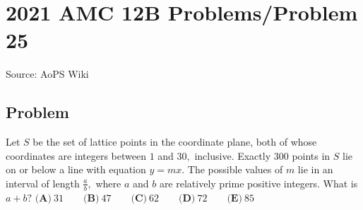 \documentclass[12pt]{article}
\begin{document}
\section*{{2021 AMC 12B Problems/Problem 25}}
Source: AoPS Wiki

\subsection*{Problem}
Let $S$ be the set of lattice points in the coordinate plane, both of whose coordinates are integers between $1$ and $30,$ inclusive. Exactly $300$ points in $S$ lie on or below a line with equation $y=mx.$ The possible values of $m$ lie in an interval of length $\frac ab,$ where $a$ and $b$ are relatively prime positive integers. What is $a+b?$ $\textbf{(A)} ~31 \qquad \textbf{(B)} ~47 \qquad \textbf{(C)} ~62\qquad \textbf{(D)} ~72 \qquad \textbf{(E)} ~85$
\end{document}
